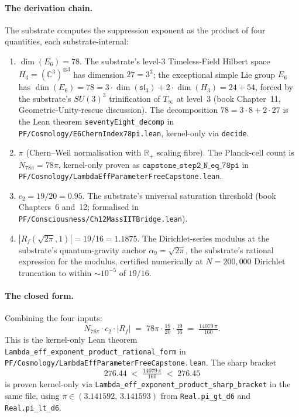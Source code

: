 \documentclass[11pt,a4paper]{amsart}
\theoremstyle{plain}
\theoremstyle{definition}
\begin{document}
\paragraph{The derivation chain.} The substrate computes the suppression exponent as the product of four quantities, each substrate-internal:
\begin{enumerate}[label=\textup{(\arabic*)},itemsep=2pt]
\item $\dim(E_6) = 78$. The substrate's level-3 Timeless-Field Hilbert space $H_3 = (\mathbb{C}^3)^{\otimes 3}$ has dimension $27 = 3^3$; the exceptional simple Lie group $E_6$ has $\dim(E_6) = 78 = 3\cdot\dim(\mathfrak{sl}_3) + 2\cdot\dim(H_3) = 24 + 54$, forced by the substrate's $SU(3)^3$ trinification of $T_\infty$ at level~3 (book Chapter~11, Geometric-Unity-rescue discussion). The decomposition $78 = 3\cdot 8 + 2\cdot 27$ is the Lean theorem \texttt{seventyEight\_decomp} in \texttt{PF/Cosmology/E6ChernIndex78pi.lean}, kernel-only via \texttt{decide}.

\item $\pi$ (Chern--Weil normalisation with $\mathbb{R}_+$ scaling fibre). The Planck-cell count is $N_{78\pi} = 78\pi$, kernel-only proven as $\texttt{capstone\_step2\_N\_eq\_78pi}$ in \texttt{PF/Cosmology/Lambda\-Eff\-Para\-meter\-Free\-Capstone.lean}.

\item $c_2 = 19/20 = 0.95$. The substrate's universal saturation threshold (book Chapters~6 and~12; formalised in \texttt{PF/Consciousness/Ch12MassIITBridge.lean}).

\item $|R_f(\sqrt{2\pi}, 1)| = 19/16 = 1.1875$. The Dirichlet-series modulus at the substrate's quantum-gravity anchor $\alpha_9 = \sqrt{2\pi}$, the substrate's rational expression for the modulus, certified numerically at $N = 200{,}000$ Dirichlet truncation to within $\sim 10^{-5}$ of $19/16$.
\end{enumerate}

\paragraph{The closed form.} Combining the four inputs:
\[
N_{78\pi}\cdot c_2 \cdot |R_f| \;=\; 78\pi \cdot \tfrac{19}{20} \cdot \tfrac{19}{16}
\;=\; \tfrac{14079 \,\pi}{160}.
\]
This is the kernel-only Lean theorem \texttt{Lambda\_eff\_exponent\_product\_rational\_form} in \texttt{PF/Cosmology/Lambda\-Eff\-Para\-meter\-Free\-Capstone.lean}. The sharp bracket
\[
276.44 \;<\; \tfrac{14079\,\pi}{160} \;<\; 276.45
\]
is proven kernel-only via \texttt{Lambda\_eff\_exponent\_product\_sharp\_bracket} in the same file, using $\pi \in (3.141592,\,3.141593)$ from \texttt{Real.pi\_gt\_d6} and \texttt{Real.pi\_lt\_d6}.
\end{document}
